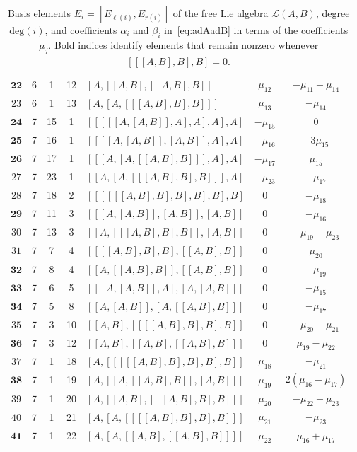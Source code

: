 \documentclass[11pt]{article}
\begin{document}
\begin{table}[ht]
\begin{tabular}{cccclcc}
$\mathbf{22}$ & 6 & 1 & 12 & $[A,[[A,B],[[A,B],B]]]$ & $\mu_{12}$ & $- \mu_{11} - \mu_{14}$ \\
$23$ & 6 & 1 & 13 & $[A,[A,[[[A,B],B],B]]]$ & $\mu_{13}$ & $- \mu_{14}$ \\
\hline
$\mathbf{24}$ & 7 & 15 & 1 & $[[[[[A,[A,B]],A],A],A],A]$ & $- \mu_{15}$ & $0$ \\
$\mathbf{25}$ & 7 & 16 & 1 & $[[[[A,[A,B]],[A,B]],A],A]$ & $- \mu_{16}$ & $- 3\mu_{15}$ \\
$\mathbf{26}$ & 7 & 17 & 1 & $[[[A,[A,[[A,B],B]]],A],A]$ & $- \mu_{17}$ & $\mu_{15}$ \\
$27$ & 7 & 23 & 1 & $[[A,[A,[[[A,B],B],B]]],A]$ & $- \mu_{23}$ & $- \mu_{17}$ \\
$28$ & 7 & 18 & 2 & $[[[[[[A,B],B],B],B],B],B]$ & $0$ & $- \mu_{18}$ \\
$\mathbf{29}$ & 7 & 11 & 3 & $[[[A,[A,B]],[A,B]],[A,B]]$ & $0$ & $- \mu_{16}$ \\
$30$ & 7 & 13 & 3 & $[[A,[[[A,B],B],B]],[A,B]]$ & $0$ & $- \mu_{19} + \mu_{23}$ \\
$31$ & 7 & 7 & 4 & $[[[[A,B],B],B],[[A,B],B]]$ & $0$ & $\mu_{20}$ \\
$\mathbf{32}$ & 7 & 8 & 4 & $[[A,[[A,B],B]],[[A,B],B]]$ & $0$ & $- \mu_{19}$ \\
$\mathbf{33}$ & 7 & 6 & 5 & $[[[A,[A,B]],A],[A,[A,B]]]$ & $0$ & $- \mu_{15}$ \\
$\mathbf{34}$ & 7 & 5 & 8 & $[[A,[A,B]],[A,[[A,B],B]]]$ & $0$ & $- \mu_{17}$ \\
$35$ & 7 & 3 & 10 & $[[A,B],[[[[A,B],B],B],B]]$ & $0$ & $- \mu_{20} - \mu_{21}$ \\
$\mathbf{36}$ & 7 & 3 & 12 & $[[A,B],[[A,B],[[A,B],B]]]$ & $0$ & $\mu_{19} - \mu_{22}$ \\
$37$ & 7 & 1 & 18 & $[A,[[[[[A,B],B],B],B],B]]$ & $\mu_{18}$ & $- \mu_{21}$ \\
$\mathbf{38}$ & 7 & 1 & 19 & $[A,[[A,[[A,B],B]],[A,B]]]$ & $\mu_{19}$ & $2(\mu_{16} - \mu_{17})$ \\
$39$ & 7 & 1 & 20 & $[A,[[A,B],[[[A,B],B],B]]]$ & $\mu_{20}$ & $- \mu_{22} - \mu_{23}$ \\
$40$ & 7 & 1 & 21 & $[A,[A,[[[[A,B],B],B],B]]]$ & $\mu_{21}$ & $- \mu_{23}$ \\
$\mathbf{41}$ & 7 & 1 & 22 & $[A,[A,[[A,B],[[A,B],B]]]]$ & $\mu_{22}$ & $\mu_{16} + \mu_{17}$ \\
\hline
\end{tabular}
\caption{Basis elements $E_i=[E_{\ell(i)}, E_{r(i)}]$ of the free Lie algebra
$\mathcal{L}(A,B)$, degree $\mathrm{deg}(i)$, and coefficients $\alpha_i$
and $\beta_i$ in~\eqref{eq:adAadB} in terms of the coefficients $\mu_j$.
Bold indices identify elements that remain nonzero whenever
$[[[A,B],B],B]= 0$.}
\label{tb:basis}
\end{table}
\end{document}
